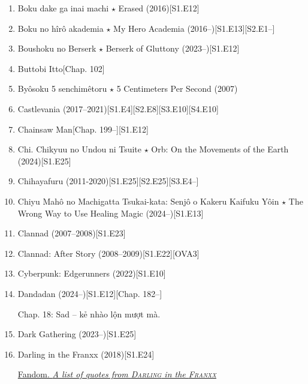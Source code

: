 \documentclass{article}
\begin{document}
\begin{enumerate}
\begin{itemize}
    \end{itemize}
    \item {\sc Boku dake ga inai machi $\star$ Erased} (2016)\hfill[S1.E12]
    \item Boku no hîrô akademia $\star$ My Hero Academia (2016--)\hfill[S1.E13][S2.E1--]
    \item {\sc Boushoku no Berserk $\star$ Berserk of Gluttony} (2023--)\hfill[S1.E12]
    \item {\sc Buttobi Itto}\hfill[Chap. 102]
    \item {\sc By\^osoku 5 senchimêtoru $\star$ 5 Centimeters Per Second} (2007)
    \item {\sc Castlevania} (2017--2021)\hfill[S1.E4][S2.E8][S3.E10][S4.E10]
    \item {\sc Chainsaw Man}\hfill[Chap. 199--][S1.E12]
    \item {\sc Chi. Chikyuu no Undou ni Tsuite $\star$ Orb: On the Movements of the Earth} (2024)\hfill[S1.E25]
    \item Chihayafuru (2011-2020)\hfill[S1.E25][S2.E25][S3.E4--]
    \item {\sc Chiyu Mahô no Machigatta Tsukai-kata: Senjô o Kakeru Kaifuku Yôin $\star$ The Wrong Way to Use Healing Magic} (2024--)[S1.E13]
    \item {\sc Clannad} (2007--2008)\hfill[S1.E23]
    \item {\sc Clannad: After Story} (2008--2009)\hfill[S1.E22][OVA3]
    \item {\sc Cyberpunk: Edgerunners} (2022)\hfill[S1.E10]
    \item Dandadan (2024--)\hfill[S1.E12][Chap. 182--]
    
    Chap. 18: Sad -- kẻ nhào lộn mượt mà.
    \item {\sc Dark Gathering} (2023--)\hfill[S1.E25]
    \item {\sc Darling in the Franxx} (2018)\hfill[S1.E24]
    
    \href{https://darling-in-the-franxx.fandom.com/wiki/List_of_Quotes}{Fandom. {\it A list of quotes from \textsc{Darling} in the \textsc{Franxx}}}
    

\end{enumerate}
\end{document}
